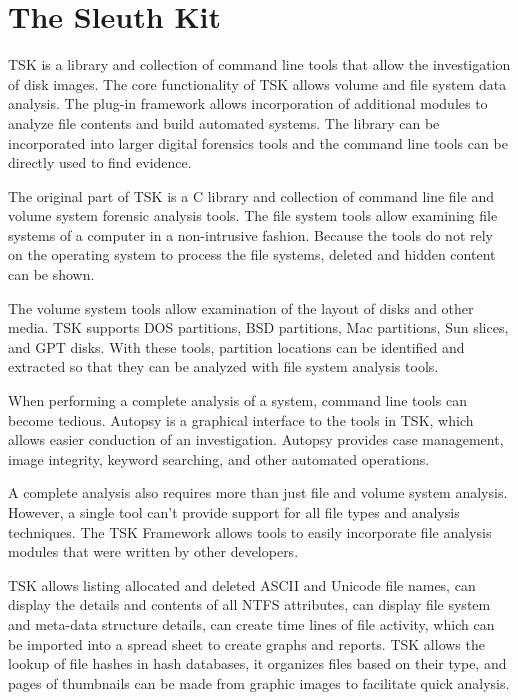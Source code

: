 \section{The Sleuth Kit}

TSK is a library and collection of command line tools that allow the
investigation of disk images. The core functionality of TSK allows volume and file system data analysis.
The plug-in framework allows incorporation of additional modules to analyze file contents
and build automated systems. The library can be incorporated into larger digital forensics tools and
the command line tools can be directly used to find evidence.

The original part of TSK is a C library and collection of command line
file and volume system forensic analysis tools. The file system tools allow examining file systems
of a computer in a non-intrusive fashion. Because the tools do not rely on the operating system to process
the file systems, deleted and hidden content can be shown.

The volume system tools allow examination of the layout of disks
and other media. TSK supports DOS partitions, BSD partitions, Mac partitions, Sun slices, and 
GPT disks. With these tools, partition locations can be identified 
and extracted so that they can be analyzed with file system analysis tools.

When performing a complete analysis of a system, command line 
tools can become tedious. Autopsy is a graphical interface to the tools in TSK, 
which allows easier conduction of an investigation. Autopsy 
provides case management, image integrity, keyword searching, and other automated
operations.

A complete analysis also requires more than just file and volume system analysis.
However, a single tool can't provide support for all file types and analysis 
techniques. The TSK Framework allows tools to easily incorporate file analysis
modules that were written by other developers.

TSK allows listing allocated and deleted ASCII and Unicode file names, can display the
details and contents of all NTFS attributes, can display file system and meta-data structure details,
can create time lines of file activity, which can be imported into a spread sheet to create graphs and reports.
TSK allows the lookup of file hashes in hash databases, it organizes files based on their type, and pages of
thumbnails can be made from graphic images to facilitate quick analysis.

